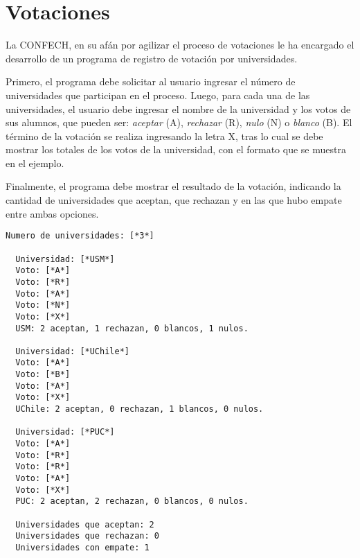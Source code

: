 \section{Votaciones}

  La CONFECH,
  en su afán por agilizar el proceso de votaciones
  le ha encargado el desarrollo de un programa
  de registro de votación por universidades.
  
  Primero,
  el programa debe solicitar al usuario
  ingresar el número de universidades que participan
  en el proceso.
  Luego,
  para cada una de las universidades,
  el usuario debe ingresar el nombre de la universidad
  y los votos de sus alumnos,
  que pueden ser:
  \emph{aceptar} (A),
  \emph{rechazar} (R),
  \emph{nulo} (N) o
  \emph{blanco} (B).
  El término de la votación se realiza ingresando 
  la letra X,
  tras lo cual se debe mostrar los totales de los votos
  de la universidad,
  con el formato que se muestra en el ejemplo.
  
  Finalmente,
  el programa debe mostrar el resultado de la votación,
  indicando la cantidad de universidades
  que aceptan,
  que rechazan
  y en las que hubo empate entre ambas opciones.
  
  \begin{lstlisting}[style=consola]
  Numero de universidades: [*3*]
 
  Universidad: [*USM*]
  Voto: [*A*]
  Voto: [*R*]
  Voto: [*A*]
  Voto: [*N*]
  Voto: [*X*]
  USM: 2 aceptan, 1 rechazan, 0 blancos, 1 nulos.

  Universidad: [*UChile*]
  Voto: [*A*]
  Voto: [*B*]
  Voto: [*A*]
  Voto: [*X*]
  UChile: 2 aceptan, 0 rechazan, 1 blancos, 0 nulos.

  Universidad: [*PUC*]
  Voto: [*A*]
  Voto: [*R*]
  Voto: [*R*]
  Voto: [*A*]
  Voto: [*X*]
  PUC: 2 aceptan, 2 rechazan, 0 blancos, 0 nulos.

  Universidades que aceptan: 2
  Universidades que rechazan: 0
  Universidades con empate: 1
  \end{lstlisting}